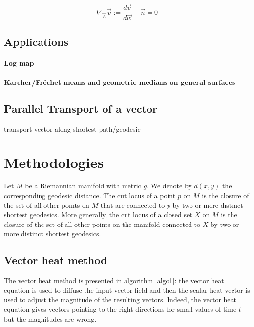 \documentclass[sigconf]{acmart}
\begin{document}
\begin{equation}
  \nabla_{\vec{W}}\vec{v}:=\frac{d\vec{v}}{d\vec{w}}-\vec{n}=0
  \label{eq:covariant derivative}
\end{equation}

\subsection{Applications}

\paragraph{Log map}

\paragraph{Karcher/Fréchet means and geometric medians on general surfaces }


\subsection{Parallel Transport of a vector}

transport vector along shortest path/geodesic



\section{Methodologies}
Let $M$ be a Riemannian manifold with metric $g$. We denote by $d(x,y)$ the corresponding geodesic distance. 
The cut locus of a point $p$ on $M$ is the closure of the set of all other points on $M$ that are connected to $p$
by two or more distinct shortest geodesics. More generally, the cut locus of a closed set $X$ on $M$ is the closure of the set of 
all other points on the manifold connected to $X$ by two or more distinct shortest geodesics.
\subsection{Vector heat method}
The vector heat method \cite{sharp_vector_2019} is presented in algorithm \ref{algo1}: the vector heat equation is used to diffuse the input vector field and then the scalar heat vector is used to adjust the magnitude of the resulting vectors. Indeed, the vector heat equation gives vectors pointing to the right directions for small values of time $t$ but the magnitudes are wrong. 
\end{document}
